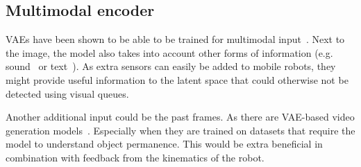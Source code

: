 \subsection{Multimodal encoder}
VAEs have been shown to be able to be trained for multimodal input~\cite{sadok2024multimodal,shi2019variational,sutter2021generalized,suzuki2016joint,wu2018multimodal}. Next to the image, the model also takes into account other forms of information (e.g. sound~\cite{sadok2024multimodal} or text~\cite{suzuki2016joint}). As extra sensors can easily be added to mobile robots, they might provide useful information to the latent space that could otherwise not be detected using visual queues.

Another additional input could be the past frames. As there are VAE-based video generation models~\cite{yan2021videogpt}. Especially when they are trained on datasets that require the model to understand object permanence. This would be extra beneficial in combination with feedback from the kinematics of the robot.

